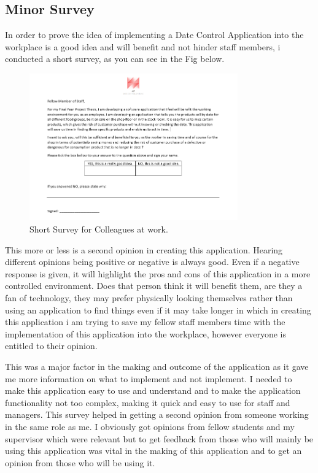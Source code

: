 \subsection{Minor Survey}
In order to prove the idea of implementing a Date Control Application into the workplace is a good idea and will benefit and not hinder staff members, i conducted a short survey, as you can see in the Fig below.

\begin{figure}[h!]
	\caption{Short Survey for Colleagues at work.}
	\label{image:survey}
	\centering
	\includegraphics[width=0.8\textwidth]{images/AF-Date-Control-Survey.PNG}
\end{figure}

This more or less is a second opinion in creating this application. Hearing different opinions being positive or negative is always good. Even if a negative response is given, it will highlight the pros and cons of this application in a more controlled environment. Does that person think it will benefit them, are they a fan of technology, they may prefer physically looking themselves rather than using an application to find things even if it may take longer in which in creating this application i am trying to save my fellow staff members time with the implementation of this application into the workplace, however everyone is entitled to their opinion. 
\newline

This was a major factor in the making and outcome of the application as it gave me more information on what to implement and not implement. I needed to make this application easy to use and understand and to make the application functionality not too complex, making it quick and easy to use for staff and managers. This survey helped in getting a second opinion from someone working in the same role as me. I obviously got opinions from fellow students and my supervisor which were relevant but to get feedback from those who will mainly be using this application was vital in the making of this application and to get an opinion from those who will be using it.
\newline

